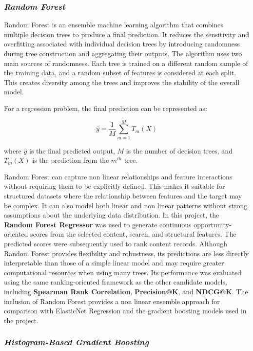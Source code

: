 \documentclass[12pt,a4paper]{report}
\begin{document}
\subsubsection{\textit{Random Forest}}

Random Forest is an ensemble machine learning algorithm that combines multiple decision trees to produce a final prediction. It reduces the sensitivity and overfitting associated with individual decision trees by introducing randomness during tree construction and aggregating their outputs. The algorithm uses two main sources of randomness. Each tree is trained on a different random sample of the training data, and a random subset of features is considered at each split. This creates diversity among the trees and improves the stability of the overall model.

For a regression problem, the final prediction can be represented as:

\begin{equation}
\hat{y} =
\frac{1}{M}
\sum_{m=1}^{M}
T_m(X)
\end{equation}

where $\hat{y}$ is the final predicted output, $M$ is the number of decision trees, and $T_m(X)$ is the prediction from the $m^{th}$ tree.

Random Forest can capture non linear relationships and feature interactions without requiring them to be explicitly defined. This makes it suitable for structured datasets where the relationship between features and the target may be complex. It can also model both linear and non linear patterns without strong assumptions about the underlying data distribution. In this project, the \textbf{Random Forest Regressor} was used to generate continuous opportunity-oriented scores from the selected content, search, and structural features. The predicted scores were subsequently used to rank content records. Although Random Forest provides flexibility and robustness, its predictions are less directly interpretable than those of a simple linear model and may require greater computational resources when using many trees. Its performance was evaluated using the same ranking-oriented framework as the other candidate models, including \textbf{Spearman Rank Correlation}, \textbf{Precision@K}, and \textbf{NDCG@K}. The inclusion of Random Forest provides a non linear ensemble approach for comparison with ElasticNet Regression and the gradient boosting models used in the project.

\subsubsection{\textit{Histogram-Based Gradient Boosting}}
\end{document}
